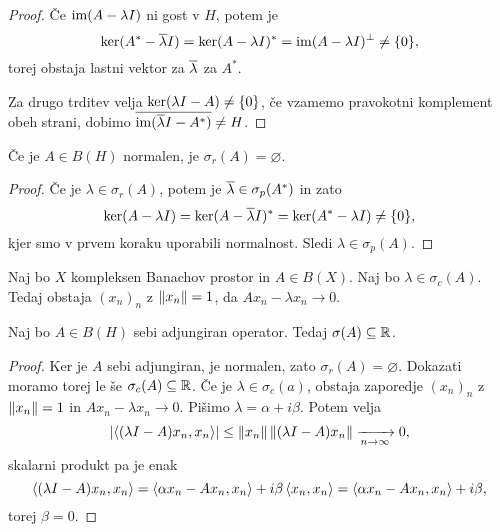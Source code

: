\begin{proof}
  Če $\operatorname{im}(A - \lambda I)$ ni gost v $H$, potem je
  \[
	\operatorname{ker} (A^* - \overline{\lambda} I)
	= \operatorname{ker} (A - \lambda I)^*
	= \operatorname{im} (A - \lambda I)^\bot
	\ne \{0\},
  \]
  torej obstaja lastni vektor za $\overline{\lambda}$ za $A^*$.

  Za drugo trditev velja $\operatorname{ker} (\lambda I -A) \ne \{0\}$, če vzamemo
  pravokotni komplement obeh strani, dobimo $\overline{\operatorname{im} (\overline{\lambda} I - A^*)}
  \ne H$.
\end{proof}


\begin{posledica}
  Če je $A \in B(H)$ normalen, je $\sigma_r(A) = \varnothing$.
\end{posledica}

\begin{proof}
  Če je $\lambda \in \sigma_r(A)$, potem je $\overline{\lambda} \in \sigma_p(A^*)$
  in zato
  \[
	\operatorname{ker} (A - \lambda I) = \operatorname{ker}(A - \overline{\lambda} I)^*
	= \operatorname{ker}(A^* - \lambda I) \ne \{0\},
  \]
  kjer smo v prvem koraku uporabili normalnost.
  Sledi $\lambda \in \sigma_p(A)$.
  \protislovje{}
\end{proof}


\begin{lema}
  Naj bo $X$ kompleksen Banachov prostor in $A \in B(X)$.
  Naj bo $\lambda \in \sigma_c(A)$.
  Tedaj obstaja $(x_n)_n$ z $\left\lVert x_n\right\rVert = 1$, da $A x_n - \lambda x_n \to 0$.
\end{lema}

\begin{izrek}
  Naj bo $A \in B(H)$ sebi adjungiran operator.
  Tedaj $\sigma(A) \subseteq \mathbb{R}$.
\end{izrek}

\begin{proof}
  Ker je $A$ sebi adjungiran, je normalen, zato $\sigma_r(A) = \varnothing$.
  Dokazati moramo torej le še $\sigma_c(A) \subseteq \mathbb{R}$.
  Če je $\lambda \in \sigma_c(a)$, obstaja zaporedje $(x_n)_n$ z $\left\lVert x_n\right\rVert = 1$
  in $A x_n - \lambda x_n \to 0$.
  Pišimo $\lambda = \alpha + i \beta$.
  Potem velja
  \[
	\left| \left< (\lambda I - A) x_n, x_n \right> \right|
	\le \left\lVert x_n\right\rVert \left\lVert(\lambda I - A) x_n\right\rVert
	\xrightarrow[n \to \infty]{} 0,
  \]
  skalarni produkt pa je enak
  \[
	\left< (\lambda I - A) x_n, x_n \right>
	= \left< \alpha x_n - A x_n, x_n \right> + i \beta \left< x_n, x_n \right>
	= \left< \alpha x_n - A x_n, x_n \right> + i \beta,
  \]
  torej $\beta = 0$.
\end{proof}

